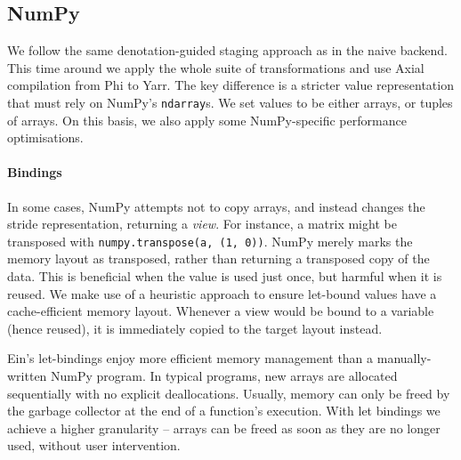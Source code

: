 \subsection{NumPy}

We follow the same denotation-guided staging approach as in the naive backend. This time around we apply the whole suite of transformations and use Axial compilation from Phi to Yarr. The key difference is a stricter value representation that must rely on NumPy's \texttt{ndarray}s. We set values to be either arrays, or tuples of arrays. On this basis, we also apply some NumPy-specific performance optimisations.

\paragraph{Bindings} In some cases, NumPy attempts not to copy arrays, and instead changes the stride representation, returning a \textit{view}. For instance, a matrix might be transposed with \texttt{numpy.transpose(a, (1, 0))}. NumPy merely marks the memory layout as transposed, rather than returning a transposed copy of the data. This is beneficial when the value is used just once, but harmful when it is reused. We make use of a heuristic approach to ensure let-bound values have a cache-efficient memory layout. Whenever a view would be bound to a variable (hence reused), it is immediately copied to the target layout instead. 

Ein's let-bindings enjoy more efficient memory management than a manually-written NumPy program. In typical programs, new arrays are allocated sequentially with no explicit deallocations. Usually, memory can only be freed by the garbage collector at the end of a function's execution. With let bindings we achieve a higher granularity -- arrays can be freed as soon as they are no longer used, without user intervention.


